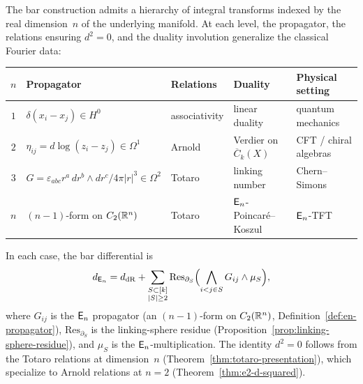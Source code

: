 \begin{proposition}
\label{prop:en-fourier-hierarchy}
The bar construction admits a hierarchy of integral transforms
indexed by the real dimension~$n$ of the underlying manifold.
At each level, the propagator, the relations ensuring $d^2 = 0$,
and the duality involution generalize the classical Fourier data:

\medskip
\begin{center}
\small
\renewcommand{\arraystretch}{1.3}
\begin{tabular}{@{}cllll@{}}
\hline
$n$ & Propagator & Relations & Duality & Physical setting \\
\hline
$1$ & $\delta(x_i - x_j) \in H^0$
  & associativity & linear duality
  & quantum mechanics \\[2pt]
$2$ & $\eta_{ij} = d\log(z_i - z_j) \in \Omega^1$
  & Arnold & Verdier on $\overline{C}_k(X)$
  & CFT / chiral algebras \\[2pt]
$3$ & $G = \varepsilon_{abc} r^a\, dr^b \wedge dr^c / 4\pi|r|^3
    \in \Omega^2$
  & Totaro & linking number
  & Chern--Simons \\[2pt]
$n$ & $(n{-}1)$-form on $C_2(\mathbb{R}^n)$
  & Totaro & $\mathsf{E}_n$-Poincar\'e--Koszul
  & $\mathsf{E}_n$-TFT \\
\hline
\end{tabular}
\end{center}
\medskip

\noindent
In each case, the bar differential is
\[
d_{\mathsf{E}_n}
= d_{\mathrm{dR}}
+ \sum_{\substack{S \subset [k] \\ |S| \geq 2}}
\mathrm{Res}_{\partial_S}
\Bigl(\bigwedge_{i < j \in S} G_{ij} \wedge \mu_S\Bigr),
\]
where $G_{ij}$ is the $\mathsf{E}_n$ propagator
\textup{(}an $(n{-}1)$-form on $C_2(\mathbb{R}^n)$,
Definition~\textup{\ref{def:en-propagator})},
$\mathrm{Res}_{\partial_S}$ is the linking-sphere residue
\textup{(}Proposition~\textup{\ref{prop:linking-sphere-residue})},
and $\mu_S$ is the $\mathsf{E}_n$-multiplication.  The identity $d^2 = 0$
follows from the Totaro relations at dimension~$n$
\textup{(}Theorem~\textup{\ref{thm:totaro-presentation})},
which specialize to Arnold relations at $n = 2$
\textup{(}Theorem~\textup{\ref{thm:e2-d-squared})}.
\end{proposition}

